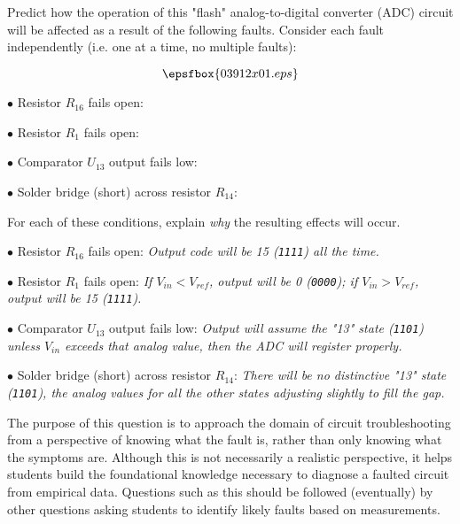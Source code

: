 

Predict how the operation of this "flash" analog-to-digital converter (ADC) circuit will be affected as a result of the following faults.  Consider each fault independently (i.e. one at a time, no multiple faults):

$$\epsfbox{03912x01.eps}$$

\medskip
\item{$\bullet$} Resistor $R_{16}$ fails open:
\vskip 5pt
\item{$\bullet$} Resistor $R_1$ fails open:
\vskip 5pt
\item{$\bullet$} Comparator $U_{13}$ output fails low:
\vskip 5pt
\item{$\bullet$} Solder bridge (short) across resistor $R_{14}$:
\medskip

For each of these conditions, explain {\it why} the resulting effects will occur.







\medskip
\item{$\bullet$} Resistor $R_{16}$ fails open: {\it Output code will be 15 ({\tt 1111}) all the time.}
\vskip 5pt
\item{$\bullet$} Resistor $R_1$ fails open: {\it If $V_{in} < V_{ref}$, output will be 0 ({\tt 0000}); if $V_{in} > V_{ref}$, output will be 15 ({\tt 1111}).}
\vskip 5pt
\item{$\bullet$} Comparator $U_{13}$ output fails low: {\it Output will assume the "13" state ({\tt 1101}) unless $V_{in}$ exceeds that analog value, then the ADC will register properly.}
\vskip 5pt
\item{$\bullet$} Solder bridge (short) across resistor $R_{14}$: {\it There will be no distinctive "13" state ({\tt 1101}), the analog values for all the other states adjusting slightly to fill the gap.}
\medskip







The purpose of this question is to approach the domain of circuit troubleshooting from a perspective of knowing what the fault is, rather than only knowing what the symptoms are.  Although this is not necessarily a realistic perspective, it helps students build the foundational knowledge necessary to diagnose a faulted circuit from empirical data.  Questions such as this should be followed (eventually) by other questions asking students to identify likely faults based on measurements.




